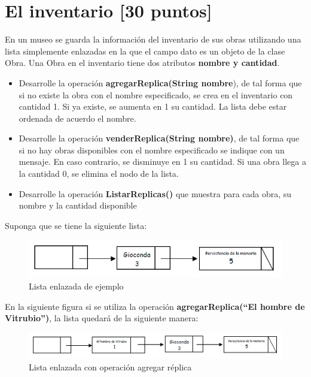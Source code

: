 \documentclass[twocolumn]{article}
\begin{document}
\section{El inventario \small{[30 puntos]}}

En un museo se guarda la información del inventario de sus obras utilizando una lista
simplemente enlazadas en la que el campo dato es un objeto de la clase Obra. Una Obra en el
inventario tiene dos atributos \textbf{nombre y cantidad}.

\begin{itemize}
	\item Desarrolle la operación \textbf{agregarReplica(String nombre}), de tal forma que si no existe la obra con el nombre especificado, se crea en el inventario con cantidad 1. Si ya existe, se aumenta en 1 su cantidad. La lista debe estar ordenada de acuerdo el nombre.
	\item Desarrolle la operación \textbf{venderReplica(String nombre)}, de tal forma que si no hay obras disponibles con el nombre especificado se indique con un mensaje. En caso contrario, se disminuye en 1 su cantidad. Si una obra llega a la cantidad 0, se elimina el nodo de la lista.
	\item Desarrolle la operación \textbf{ListarReplicas()} que muestra para cada obra, su nombre y la cantidad disponible
\end{itemize}

Suponga que se tiene la siguiente lista:

\begin{figure}[H]
	\centering
	\includegraphics[scale=0.4]{ListaEnlazadaOp1.jpg}
	\caption{Lista enlazada de ejemplo}
\end{figure}

En la siguiente figura si se utiliza la operación \textbf{agregarReplica(``El hombre de Vitrubio'')}, la lista quedará de la siguiente manera:

\begin{figure}[H]
	\centering
	\includegraphics[scale=0.35]{ListaEnlazadaOp2.jpg}
	\caption{Lista enlazada con operación agregar réplica}
\end{figure}
\end{document}
